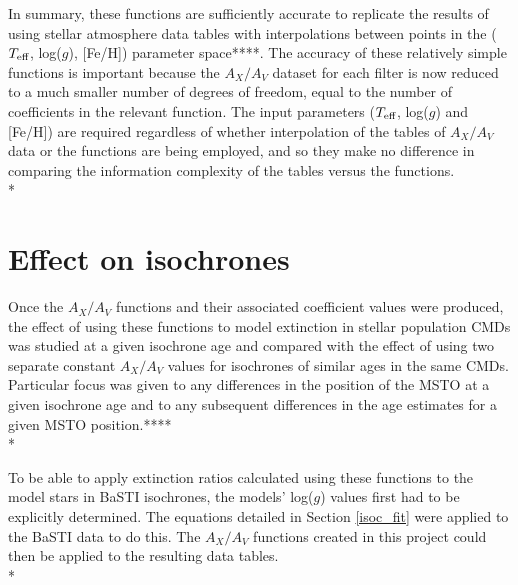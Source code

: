 \documentclass[12pt, a4paper]{report}
\begin{document}
In summary, these functions are sufficiently accurate to replicate the results of using stellar atmosphere data tables with interpolations between points in the ($T_{\textnormal{eff}}$, log($g$), [Fe/H]) parameter space****. The accuracy of these relatively simple functions is important because the $A_{X}/A_{V}$ dataset for each filter is now reduced to a much smaller number of degrees of freedom, equal to the number of coefficients in the relevant function. The input parameters ($T_{\textnormal{eff}}$, log($g$) and [Fe/H]) are required regardless of whether interpolation of the tables of $A_{X}/A_{V}$ data or the functions are being employed, and so they make no difference in comparing the information complexity of the tables versus the functions.\\*


\section{Effect on isochrones} \label{result_CMDs}
Once the $A_{X}/A_{V}$ functions and their associated coefficient values were produced, the effect of using these functions to model extinction in stellar population CMDs was studied at a given isochrone age and compared with the effect of using two separate constant $A_{X}/A_{V}$ values for isochrones of similar ages in the same CMDs. Particular focus was given to any differences in the position of the MSTO at a given isochrone age and to any subsequent differences in the age estimates for a given MSTO position.**** \\*

To be able to apply extinction ratios calculated using these functions to the model stars in BaSTI isochrones, the models' log($g$) values first had to be explicitly determined. The equations detailed in Section \ref{isoc_fit} were applied to the BaSTI data to do this. The $A_{X}/A_{V}$ functions created in this project could then be applied to the resulting data tables. \\*
\end{document}
